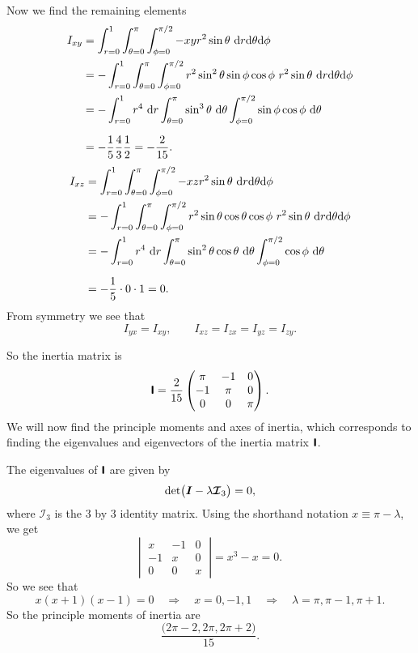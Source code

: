 \documentclass[a4paper, 11pt, titlepage, english]{article}
\renewcommand{\d}{{\rm d}}
\newcommand{\To}{\quad\Rightarrow\quad}
\newcommand{\bt}[1]{\boldsymbol{#1}}
\newcommand{\mat}[1]{\textsf{\textbf{#1}}}
\newcommand{\I}{\boldsymbol{\mathcal{I}}}
\begin{document}
Now we find the remaining elements
\begin{align*}
I_{xy} &=\int_{r=0}^1\int_{\theta=0}^{\pi}\int_{\phi=0}^{\pi/2} -xyr^2\sin\theta \ \d r \d \theta \d \phi \\
&= -\int_{r=0}^1\int_{\theta=0}^{\pi}\int_{\phi=0}^{\pi/2} r^2\sin^2\theta\sin\phi\cos\phi\ r^2\sin\theta \ \d r \d \theta \d \phi \\
&= -\int_{r=0}^1 r^4 \ \d r \int_{\theta=0}^{\pi} \sin^3\theta \ \d\theta \int_{\phi=0}^{\pi/2} \sin\phi\cos\phi \ \d \theta \\[0.2cm]
&= - \frac{1}{5} \frac{4}{3} \frac{1}{2}= -\frac{2}{15}.
\end{align*}
\begin{align*}
I_{xz} &=\int_{r=0}^1\int_{\theta=0}^{\pi}\int_{\phi=0}^{\pi/2} -xzr^2\sin\theta \ \d r \d \theta \d \phi \\
&= -\int_{r=0}^1\int_{\theta=0}^{\pi}\int_{\phi=0}^{\pi/2} r^2\sin\theta\cos\theta\cos\phi\ r^2\sin\theta \ \d r \d \theta \d \phi \\
&= -\int_{r=0}^1 r^4 \ \d r \int_{\theta=0}^{\pi} \sin^2\theta\cos\theta \ \d\theta \int_{\phi=0}^{\pi/2} \cos\phi \ \d \theta \\[0.2cm]
&= - \frac{1}{5} \cdot 0 \cdot 1 = 0.
\end{align*}
From symmetry we see that 
$$I_{yx} = I_{xy}, \qquad I_{xz}=I_{zx} = I_{yz} = I_{zy}.$$

So the inertia matrix is
$$\mat{I} = \frac{2}{15}\begin{pmatrix}
      \pi & -1 & 0 \\
      -1 & \pi & 0 \\
      0 & 0 & \pi \\
      \end{pmatrix}.
$$
We will now find the principle moments and axes of inertia, which corresponds to finding the eigenvalues and eigenvectors of the inertia matrix $\mat{I}$.

The eigenvalues of $\mat{I}$ are given by 
$${\rm det}\big(\bt{I}-\lambda\I_3\big) = 0,$$
where $\I_3$ is the 3 by 3 identity matrix. Using the shorthand notation $x\equiv \pi - \lambda$, we get
$$\left| \ \begin{matrix}
  x & -1 & 0 \\ -1 & x & 0  \\ 0 & 0 & x
  \end{matrix} \ \right| = x^3 - x = 0.
$$
So we see that
$$x(x+1)(x-1) = 0 \To x = 0, -1, 1 \To \lambda = \pi, \pi - 1, \pi + 1.$$
So the principle moments of inertia are
$$\frac{\big(2\pi-2, 2\pi, 2\pi +2\big)}{15}.$$
\end{document}
